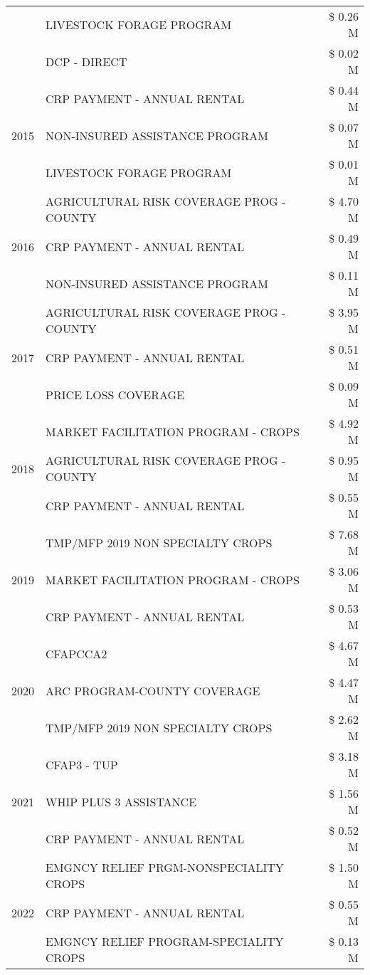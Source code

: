 \begin{tabular}{llr}
 & LIVESTOCK FORAGE PROGRAM & \$ 0.26 M \\
 & DCP - DIRECT & \$ 0.02 M \\
\cline{1-3}
\multirow[t]{3}{*}{2015} & CRP PAYMENT - ANNUAL RENTAL & \$ 0.44 M \\
 & NON-INSURED ASSISTANCE PROGRAM & \$ 0.07 M \\
 & LIVESTOCK FORAGE PROGRAM & \$ 0.01 M \\
\cline{1-3}
\multirow[t]{3}{*}{2016} & AGRICULTURAL RISK COVERAGE PROG - COUNTY & \$ 4.70 M \\
 & CRP PAYMENT - ANNUAL RENTAL & \$ 0.49 M \\
 & NON-INSURED ASSISTANCE PROGRAM & \$ 0.11 M \\
\cline{1-3}
\multirow[t]{3}{*}{2017} & AGRICULTURAL RISK COVERAGE PROG - COUNTY & \$ 3.95 M \\
 & CRP PAYMENT - ANNUAL RENTAL & \$ 0.51 M \\
 & PRICE LOSS COVERAGE & \$ 0.09 M \\
\cline{1-3}
\multirow[t]{3}{*}{2018} & MARKET FACILITATION PROGRAM - CROPS & \$ 4.92 M \\
 & AGRICULTURAL RISK COVERAGE PROG - COUNTY & \$ 0.95 M \\
 & CRP PAYMENT - ANNUAL RENTAL & \$ 0.55 M \\
\cline{1-3}
\multirow[t]{3}{*}{2019} & TMP/MFP 2019 NON SPECIALTY CROPS & \$ 7.68 M \\
 & MARKET FACILITATION PROGRAM - CROPS & \$ 3.06 M \\
 & CRP PAYMENT - ANNUAL RENTAL & \$ 0.53 M \\
\cline{1-3}
\multirow[t]{3}{*}{2020} & CFAPCCA2 & \$ 4.67 M \\
 & ARC PROGRAM-COUNTY COVERAGE & \$ 4.47 M \\
 & TMP/MFP 2019 NON SPECIALTY CROPS & \$ 2.62 M \\
\cline{1-3}
\multirow[t]{3}{*}{2021} & CFAP3 - TUP & \$ 3.18 M \\
 & WHIP PLUS 3 ASSISTANCE & \$ 1.56 M \\
 & CRP PAYMENT - ANNUAL RENTAL & \$ 0.52 M \\
\cline{1-3}
\multirow[t]{3}{*}{2022} & EMGNCY RELIEF PRGM-NONSPECIALITY CROPS & \$ 1.50 M \\
 & CRP PAYMENT - ANNUAL RENTAL & \$ 0.55 M \\
 & EMGNCY RELIEF PROGRAM-SPECIALITY CROPS & \$ 0.13 M \\
\cline{1-3}
\bottomrule
\end{tabular}
